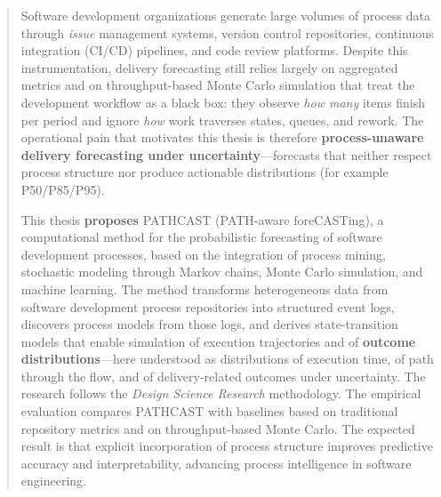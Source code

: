 \begin{abstract}
Software development organizations generate large volumes of process data
through \textit{issue} management systems, version control repositories,
continuous integration (CI/CD) pipelines, and code review platforms.
Despite this instrumentation, delivery forecasting still relies largely on
aggregated metrics and on throughput-based Monte Carlo simulation that
treat the development workflow as a black box: they observe \emph{how many}
items finish per period and ignore \emph{how} work traverses states,
queues, and rework.
The operational pain that motivates this thesis is therefore
\textbf{process-unaware delivery forecasting under uncertainty}---forecasts
that neither respect process structure nor produce actionable
distributions (for example P50/P85/P95).

This thesis \textbf{proposes} PATHCAST (PATH-aware foreCASTing), a
computational method for the probabilistic forecasting of software
development processes, based on the integration of process mining,
stochastic modeling through Markov chains, Monte Carlo simulation, and
machine learning.
The method transforms heterogeneous data from software development process
repositories into structured event logs, discovers process models from
those logs, and derives state-transition models that enable simulation of
execution trajectories and of
\textbf{outcome distributions}---here understood as distributions of
execution time, of path through the flow, and of delivery-related outcomes
under uncertainty.
The research follows the \textit{Design Science Research} methodology.
The empirical evaluation compares PATHCAST with baselines based on
traditional repository metrics and on throughput-based Monte Carlo.
The expected result is that explicit incorporation of process structure
improves predictive accuracy and interpretability, advancing process
intelligence in software engineering.
\end{abstract}
